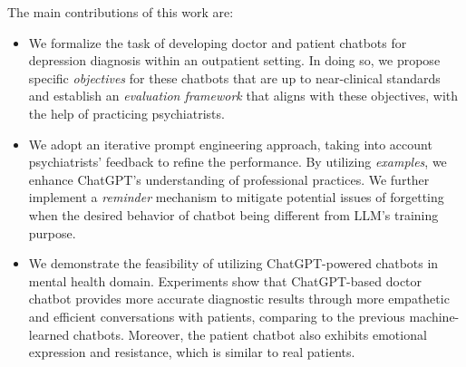 The main contributions of this work are:
\begin{itemize}
    \item We formalize the task of developing doctor and patient chatbots for depression diagnosis within an outpatient setting. In doing so, we propose specific \textit{objectives} for these chatbots that are up to near-clinical standards and establish an \textit{evaluation framework} that aligns with these objectives, with the help of practicing psychiatrists.
    \item We adopt an iterative prompt engineering approach, taking into account psychiatrists' feedback to refine the performance. By utilizing \textit{examples}, we enhance ChatGPT's understanding of professional practices. We further implement a \textit{reminder} mechanism to mitigate potential issues of forgetting when the desired behavior of chatbot being different from LLM's training purpose.
    \item We demonstrate the feasibility of utilizing ChatGPT-powered chatbots in mental health domain. Experiments show that ChatGPT-based doctor chatbot provides more accurate diagnostic results through more empathetic and efficient conversations with patients, comparing to the previous machine-learned chatbots.
    Moreover, the patient chatbot also exhibits emotional expression and 
resistance, which is similar to real patients. 
\end{itemize}





